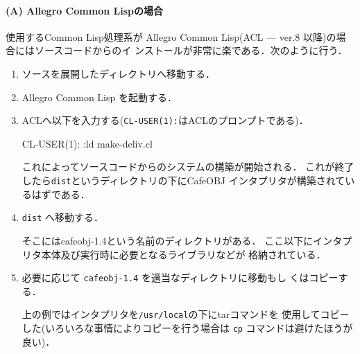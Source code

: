 \paragraph{(A) Allegro Common Lispの場合}
使用するCommon Lisp処理系が
Allegro Common Lisp(ACL --- ver.8 以降)の場合にはソースコードからのイ
ンストールが非常に楽である．次のように行う．
\begin{enumerate}
\item ソースを展開したディレクトリへ移動する．
  \begin{vvtm}
    \begin{examplev}
    \end{examplev}
  \end{vvtm}
\item Allegro Common Lisp を起動する．
  \begin{vvtm}
    \begin{examplev}
    \end{examplev}
  \end{vvtm}
\item ACLへ以下を入力する(\texttt{CL-USER(1):}はACLのプロンプトである)．
  \begin{vvtm}
    \begin{examplev}
      CL-USER(1): :ld make-deliv.cl
    \end{examplev}
  \end{vvtm}
  これによってソースコードからのシステムの構築が開始される．
  これが終了したら\texttt{dist}というディレクトリの下にCafeOBJ
  インタプリタが構築されているはずである．
\item \texttt{dist} へ移動する．
  \begin{vvtm}
    \begin{examplev}
    \end{examplev}
  \end{vvtm}
  そこにはcafeobj-1.4という名前のディレクトリがある．
  ここ以下にインタプリタ本体及び実行時に必要となるライブラリなどが
  格納されている．
\item 必要に応じて \texttt{cafeobj-1.4} を適当なディレクトリに移動もし
  くはコピーする．
  \begin{vvtm}
    \begin{examplev}
    \end{examplev}
  \end{vvtm}
  上の例ではインタプリタを\texttt{/usr/local}の下にtarコマンドを
  使用してコピーした(いろいろな事情によりコピーを行う場合は
  \texttt{cp} コマンドは避けたほうが良い)．


\end{enumerate}
